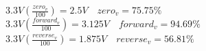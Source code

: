$3.3V(\frac{zero_v}{100}) = 2.5V\quad zero_v = 75.75\%$ \\
$3.3V(\frac{forward_v}{100}) = 3.125V\quad forward_v = 94.69\%$ \\
$3.3V(\frac{reverse_v}{100}) = 1.875V\quad reverse_v = 56.81\%$ \\




